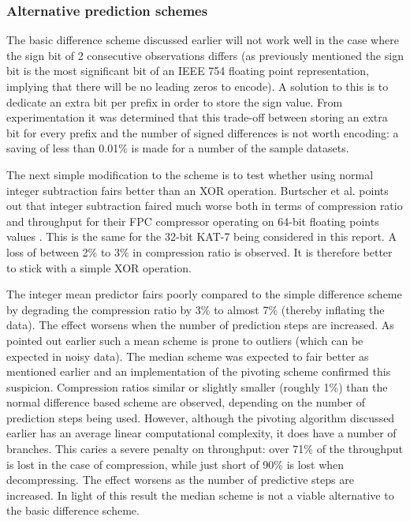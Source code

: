   \subsubsection{Alternative prediction schemes}
  The basic difference scheme discussed earlier will not work well in the case where the sign bit of 2 consecutive observations differs (as previously mentioned the sign bit is the most significant bit of an IEEE 754 
  floating point representation, implying that there will be no leading zeros to encode). A solution to this is to dedicate an extra bit per prefix in order to store the sign value. From experimentation it was determined that
  this trade-off between storing an extra bit for every prefix and the number of signed differences is not worth encoding: a saving of less than 0.01\% is made for a number of the sample datasets. 
  
  The next simple modification to the scheme is to test whether using normal integer subtraction fairs better than an XOR operation. Burtscher et al. points out that integer subtraction faired much worse both in terms of
  compression ratio and throughput for their FPC compressor operating on 64-bit floating points values \cite{4589203}. This is the same for the 32-bit KAT-7 being considered in this report. A loss of between 2\% to 3\% in 
  compression ratio is observed. It is therefore better to stick with a simple XOR operation.
  
  The integer mean predictor fairs poorly compared to the simple difference scheme by degrading the compression ratio by 3\% to almost 7\% (thereby inflating the data). The effect worsens when the number of prediction 
  steps are increased. As pointed out earlier such a mean scheme is prone to outliers (which can be expected in noisy data). The median scheme was expected to fair better as mentioned earlier and an implementation of the pivoting 
  scheme confirmed this suspicion. Compression ratios similar or slightly smaller (roughly 1\%) than the normal difference based scheme are observed, depending on the number of prediction steps being used. However, although the 
  pivoting algorithm discussed earlier has an average linear computational complexity, it does have a number of branches. This caries a severe penalty on throughput: over 
  71\% of the throughput is lost in the case of compression, while just short of 90\% is lost when decompressing. The effect worsens as the number of predictive steps are increased. In light of this result the median scheme is not
  a viable alternative to the basic difference scheme.
  

